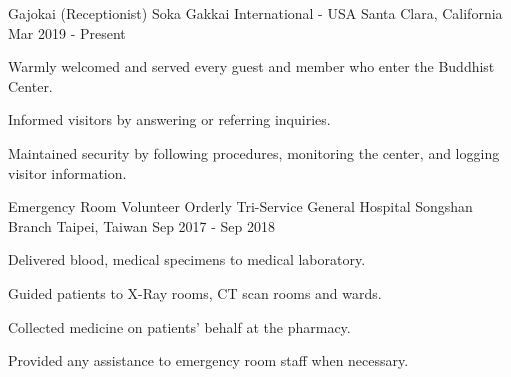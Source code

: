 

\begin{cventries}

  \cventry
    {Gajokai (Receptionist)} %
    {Soka Gakkai International - USA} %
    {Santa Clara, California} %
    {Mar 2019 - Present} %
    {
	\begin{cvitems} %
      	\item Warmly welcomed and served every guest and member who enter the Buddhist Center.
      	\item Informed visitors by answering or referring inquiries.
      	\item Maintained security by following procedures, monitoring the center, and logging visitor information.
	\end{cvitems}
    }
    
  \cventry
    {Emergency Room Volunteer Orderly} %
    {Tri-Service General Hospital Songshan Branch} %
    {Taipei, Taiwan} %
    {Sep 2017 - Sep 2018} %
    {
	\begin{cvitems} %
      	\item Delivered blood, medical specimens to medical laboratory.
		\item Guided patients to X-Ray rooms, CT scan rooms and wards.       
      	\item Collected medicine on patients' behalf at the pharmacy.
      	\item Provided any assistance to emergency room staff when necessary.
	\end{cvitems}
    }


\end{cventries}
